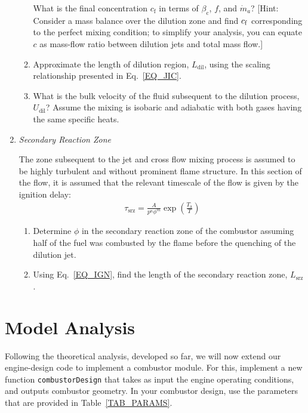 \documentclass[11pt]{article}
\begin{document}
\begin{enumerate}[label=(\alph*)]
\begin{enumerate}[label=(\roman*)]
           What is the final concentration $c_\mathrm{f}$ in terms of $\beta_\mathrm{c}$, $f$, and $\dot{m}_a$? [Hint: Consider a mass balance over the dilution zone and find $c_{\rm{f}}$ corresponding to the perfect mixing condition; to simplify your analysis, you can equate $c$ as mass-flow ratio between dilution jets and total mass flow.]
           \item
              Approximate the length of dilution region, $L_\mathrm{dil}$, using the scaling relationship presented in Eq.~\ref{EQ_JIC}.
           \item
           		What is the bulk velocity of the fluid subsequent to the dilution process, $U_\mathrm{dil}$? Assume the mixing is isobaric and adiabatic with both gases having the same specific heats. 
         \end{enumerate}
    \item \textit{Secondary Reaction Zone}
    
    	The zone subsequent to the jet and cross flow mixing process is assumed to be highly turbulent and without prominent flame structure. In this section of the flow, it is assumed that the relevant timescale of the flow is given by the ignition delay:
        \begin{equation}
          \label{EQ_IGN}
          \begin{aligned}
            \tau_\mathrm{srz}=\frac{A}{p^n\phi^m}\exp\left(\frac{T_\mathrm{a}}{T}\right)
          \end{aligned}
        \end{equation}
        \begin{enumerate}[label=(\roman*)]
        \item
        	Determine $\phi$ in the secondary reaction zone of the combustor assuming half of the fuel was combusted by the flame before the quenching of the dilution jet.
        \item
        	Using Eq.~\ref{EQ_IGN}, find the length of the secondary reaction zone, $L_\mathrm{srz}$. 
        \end{enumerate}
\end{enumerate}
\section{Model Analysis}
Following the theoretical analysis, developed so far, we will now extend our engine-design code to implement a combustor module. For this, implement a new function {\tt combustorDesign} that takes as input the engine operating conditions, and outputs combustor geometry. In your combustor design, use the parameters that are provided in Table~\ref{TAB_PARAMS}.
\end{document}
